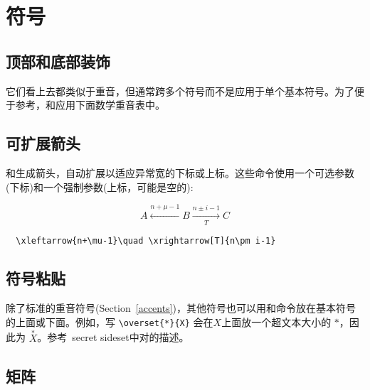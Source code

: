 \section{符号}
\label{notations}

\subsection{顶部和底部装饰}
它们看上去都类似于重音，但通常跨多个符号而不是应用于单个基本符号。为了便于参考，和应用下面数学重音表中。

\begin{symlist}
\end{symlist}

\subsection{可扩展箭头}
和生成箭头，自动扩展以适应异常宽的下标或上标。这些命令使用一个可选参数(下标)和一个强制参数(上标，可能是空的):

\begin{equation}
A\xleftarrow{n+\mu-1}B \xrightarrow[T]{n\pm i-1}C
\end{equation}
\begin{verbatim}
  \xleftarrow{n+\mu-1}\quad \xrightarrow[T]{n\pm i-1}
\end{verbatim}

\subsection{符号粘贴}
除了标准的重音符号(Section~\ref{accents})，其他符号也可以用和命令放在基本符号的上面或下面。例如，写 \verb|\overset{*}{X}| 会在$X$上面放一个超文本大小的 $*$，因此为 $\overset{*}{X}$。参考\ secret {sideset}中对的描述。


\subsection{矩阵}\label{ss:matrix}

